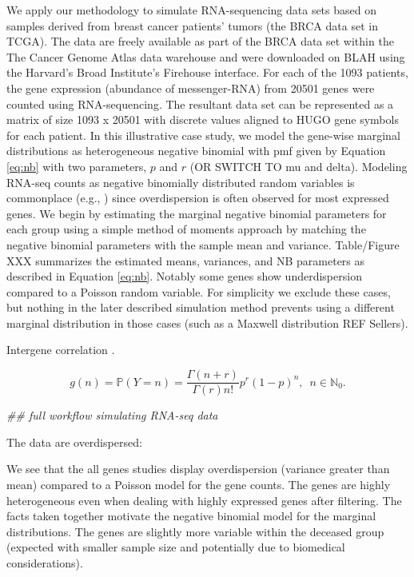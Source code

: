 \documentclass[
]{article}
\newenvironment{Shaded}{\begin{snugshade}}{\end{snugshade}}
\newcommand{\CommentTok}[1]{\textcolor[rgb]{0.56,0.35,0.01}{\textit{#1}}}
\begin{document}
We apply our methodology to simulate RNA-sequencing data sets based on samples derived from breast cancer patients' tumors (the BRCA data set in TCGA). The data are freely available as part of the BRCA data set within the The Cancer Genome Atlas data warehouse and were downloaded on BLAH using the Harvard's Broad Institute's Firehouse interface. For each of the 1093 patients, the gene expression (abundance of messenger-RNA) from 20501 genes were counted using RNA-sequencing. The resultant data set can be represented as a matrix of size 1093 x 20501 with discrete values aligned to HUGO gene symbols for each patient. In this illustrative case study, we model the gene-wise marginal distributions as heterogeneous negative binomial with pmf given by Equation \eqref{eq:nb} with two parameters, \(p\) and \(r\) (OR SWITCH TO mu and delta). Modeling RNA-seq counts as negative binomially distributed random variables is commonplace (e.g., \citet{Zhao2018}) since overdispersion is often observed for most expressed genes. We begin by estimating the marginal negative binomial parameters for each group using a simple method of moments approach by matching the negative binomial parameters with the sample mean and variance. Table/Figure XXX summarizes the estimated means, variances, and NB parameters as described in Equation \eqref{eq:nb}. Notably some genes show underdispersion compared to a Poisson random variable. For simplicity we exclude these cases, but nothing in the later described simulation method prevents using a different marginal distribution in those cases (such as a Maxwell distribution REF Sellers).

Intergene correlation \citep{Schissler2019}.

\begin{equation} 
  g(n) = \mathbb P(Y=n) = \frac{\Gamma(n+r)}{\Gamma(r)n!} p^r(1-p)^n, \,\,\, n\in
\mathbb N_0.
  \label{eq:nb}
\end{equation}

\begin{Shaded}
\begin{Highlighting}[]
\CommentTok{## full workflow simulating RNA-seq data}
\end{Highlighting}
\end{Shaded}

The data are overdispersed:

We see that the all genes studies display overdispersion (variance greater than mean) compared to a Poisson model for the gene counts. The genes are highly heterogeneous even when dealing with highly expressed genes after filtering. The facts taken together motivate the negative binomial model for the marginal distributions. The genes are slightly more variable within the deceased group (expected with smaller sample size and potentially due to biomedical considerations).
\end{document}
